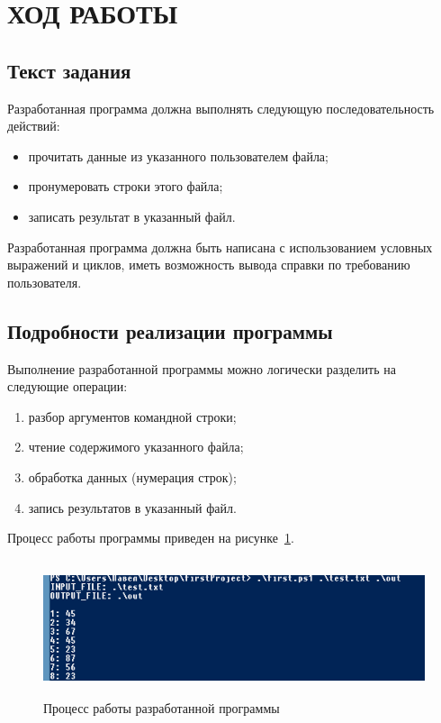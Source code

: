 \section{ХОД РАБОТЫ}

\subsection{Текст задания}

Разработанная программа должна выполнять следующую последовательность действий:

\begin{itemize}

  \item прочитать данные из указанного пользователем файла;
  \item пронумеровать строки этого файла;
  \item записать результат в указанный файл.

\end{itemize}

Разработанная программа должна быть написана с использованием условных выражений
и циклов, иметь возможность вывода справки по требованию пользователя.

\subsection{Подробности реализации программы}

Выполнение разработанной программы можно логически разделить на следующие операции:

\begin{enumerate}
  \item разбор аргументов командной строки;
  \item чтение содержимого указанного файла;
  \item обработка данных (нумерация строк);
  \item запись результатов в указанный файл.
\end{enumerate}

Процесс работы программы приведен на рисунке~\ref{fig:process}.

\begin{figure}[htbp]
  \centering
  \includegraphics[width=150mm,height=40mm]{img/process}
  \caption{Процесс работы разработанной программы}\label{fig:process}
\end{figure}

